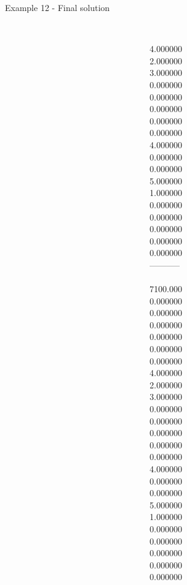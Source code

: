 \begin{frame}{Example 12 - Final solution}
\begin{columns}[t]
\begin{column}{0.3\textwidth}
\end{column}
\begin{column}{0.3\textwidth}
\\
4.000000\\
2.000000\\
3.000000\\
0.000000\\
0.000000\\
0.000000\\
0.000000\\
0.000000\\
4.000000\\
0.000000\\
0.000000\\
5.000000\\
1.000000\\
0.000000\\
0.000000\\
0.000000\\
0.000000\\
0.000000\\

-----------\\
\\
7100.000\\
0.000000\\
0.000000\\
0.000000\\
0.000000\\
0.000000\\
0.000000\\
4.000000\\
2.000000\\
3.000000\\
0.000000\\
0.000000\\
0.000000\\
0.000000\\
0.000000\\
4.000000\\
0.000000\\
0.000000\\
5.000000\\
1.000000\\
0.000000\\
0.000000\\
0.000000\\
0.000000\\
0.000000\\


\end{column}  


\end{columns}
\end{frame}
